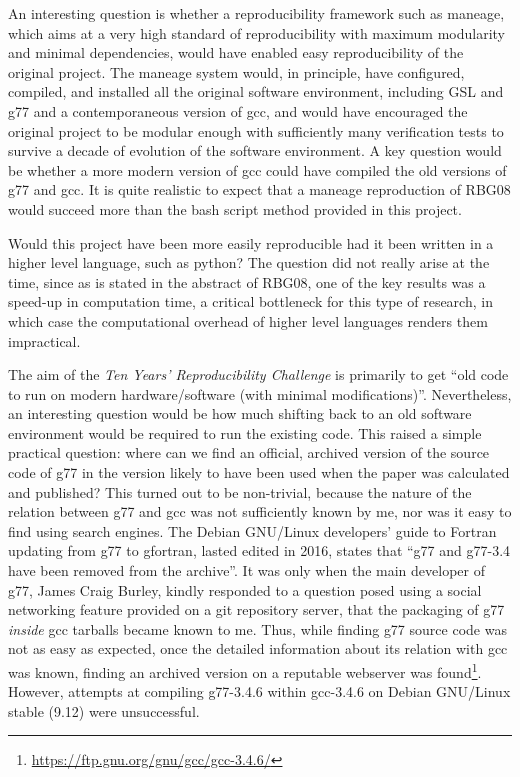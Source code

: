 An interesting question is whether a reproducibility framework such as
{\sc maneage}\supercite{Akhlaghi2020}, which aims at a very high
standard of reproducibility with maximum modularity and minimal
dependencies, would have enabled easy reproducibility of the original
project.  The {\sc maneage} system would, in principle, have
configured, compiled, and installed all the original software
environment, including {\sc GSL} and {\sc g77} and a contemporaneous
version of {\sc gcc}, and would have encouraged the original project
to be modular enough with sufficiently many verification tests to
survive a decade of evolution of the software environment.  A key
question would be whether a more modern version of {\sc gcc} could
have compiled the old versions of {\sc g77} and {\sc gcc}.
It is quite realistic to expect that a {\sc maneage} reproduction
of RBG08 would succeed more than the {\sc bash} script method
provided in this project.

Would this project have been more easily reproducible had it been
written in a higher level language, such as python? The question
did not really arise at the time, since as is stated in the abstract
of RBG08, one of the key results was a speed-up in computation
time, a critical bottleneck for this type of research, in which
case the computational overhead of higher level languages renders
them impractical.

The aim of the {\em Ten Years' Reproducibility Challenge} is primarily
to get ``old code to run on modern hardware/software (with minimal
modifications)''.  Nevertheless, an interesting question would be how
much shifting back to an old software environment would be required to
run the existing code.  This raised a simple practical question: where can we
find an official, archived version of the source code of {\sc g77} in
the version likely to have been used when the paper was calculated and
published? This turned out to be non-trivial, because the nature of
the relation between {\sc g77} and {\sc gcc} was not sufficiently
known by me, nor was it easy to find using search engines.
The Debian GNU/Linux developers' guide to Fortran
updating from {\sc g77} to {\sc gfortran}, lasted edited in 2016,
states that ``g77 and g77-3.4 have been removed from the
archive''\supercite{DebianGfortran}. It was only when the main developer
of {\sc g77}, James Craig Burley, kindly responded to a question posed
using a social networking feature provided on a git repository server,
that the packaging of {\sc g77} {\em inside} {\sc gcc} tarballs
became known to me.
Thus, while finding {\sc g77} source code was not as easy as expected,
once the detailed information about its relation with {\sc gcc} was known,
finding an archived version on a reputable webserver was found\footnote{\url{https://ftp.gnu.org/gnu/gcc/gcc-3.4.6/}}.
However, attempts at compiling
{\sc g77-3.4.6} within {\sc gcc-3.4.6} on Debian GNU/Linux stable (9.12)
were unsuccessful.

